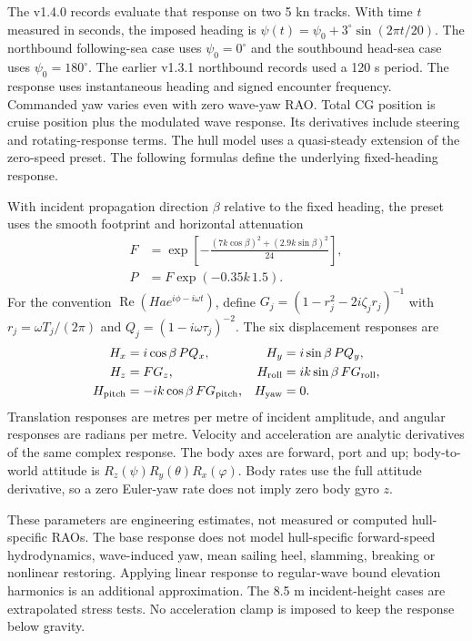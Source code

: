 \documentclass[journal,10pt,twocolumn]{IEEEtran}
\begin{document}
    The v1.4.0 records evaluate that response on two 5 kn tracks. With time
    $t$ measured in seconds, the imposed heading is
    $\psi(t)=\psi_0+3^\circ\sin(2\pi t/20)$.
    The northbound following-sea case uses $\psi_0=0^\circ$ and the
    southbound head-sea case uses $\psi_0=180^\circ$. The earlier v1.3.1
    northbound records used a 120 s period. The response uses instantaneous
    heading and signed encounter frequency. Commanded yaw varies even with
    zero wave-yaw RAO. Total CG position is cruise position plus the
    modulated wave response. Its derivatives include steering and
    rotating-response terms. The hull model uses a quasi-steady extension of
    the zero-speed preset.
    The following formulas define the underlying fixed-heading response.

    With incident propagation direction $\beta$ relative to the fixed heading,
    the preset uses the smooth footprint and horizontal attenuation
    \begin{align}
      F&=\exp\!\left[-\frac{(7k\cos\beta)^2+(2.9k\sin\beta)^2}{24}\right],\\
      P&=F\exp(-0.35k\,1.5).
    \end{align}
    For the convention $\operatorname{Re}(Ha e^{i\phi-i\omega t})$, define
    $G_j=(1-r_j^2-2i\zeta_jr_j)^{-1}$ with $r_j=\omega T_j/(2\pi)$ and
    $Q_j=(1-i\omega\tau_j)^{-2}$. The six displacement responses are
    \begin{align}
      H_x&=i\cos\beta\,P Q_x,&H_y&=i\sin\beta\,P Q_y,\\
      H_z&=F G_z,&H_{\rm roll}&=ik\sin\beta\,F G_{\rm roll},\\
      H_{\rm pitch}&=-ik\cos\beta\,F G_{\rm pitch},&H_{\rm yaw}&=0.
    \end{align}
    Translation responses are metres per metre of incident amplitude, and
    angular responses are radians per metre. Velocity and acceleration are
    analytic derivatives of the same complex response. The body axes are
    forward, port and up; body-to-world attitude is
    $R_z(\psi)R_y(\theta)R_x(\varphi)$. Body rates use the full attitude
    derivative, so a zero Euler-yaw rate does not imply zero body gyro $z$.

    These parameters are engineering estimates, not measured or computed
    hull-specific RAOs. The base response does not model hull-specific
    forward-speed hydrodynamics, wave-induced yaw,
    mean sailing heel, slamming, breaking or nonlinear restoring. Applying
    linear response to regular-wave bound elevation harmonics is an additional
    approximation. The 8.5 m incident-height cases are extrapolated stress
    tests. No acceleration clamp is imposed to keep the response below gravity.
\end{document}
